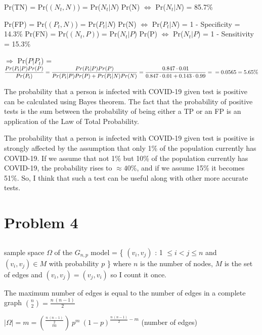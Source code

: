 \documentclass[11pt]{article}
\begin{document}
\noindent
Pr(TN) = Pr($(N_t,N)$) = Pr($N_t | N$) Pr(N) $\iff$ Pr($N_t | N$) = 85.7\% \newline

\noindent
Pr(FP) = Pr($(P_t,N)$) = Pr($P_t | N$) Pr(N) $\iff$ Pr($P_t | N$) = 1 - Specificity = 14.3\% \newline
Pr(FN) = Pr($(N_t,P)$) = Pr($N_t | P$) Pr(P) $\iff$ Pr($N_t | P$) = 1 - Sensitivity = 15.3\%

\bigskip
\noindent
$\Rightarrow$ Pr($P|P_t$) = $ \displaystyle\frac{Pr(P_t|P) Pr(P)}{Pr(P_t)} = \frac{Pr(P_t|P) Pr(P)}{Pr(P_t|P) Pr(P) + Pr(P_t|N) Pr(N)} =
\frac{0.847 \cdot 0.01}{0.847 \cdot 0.01 + 0.143 \cdot 0.99} = \\
= 0.0565 = 5.65\% $

\bigskip
The probability that a person is infected with COVID-19 given test is positive can be calculated using Bayes theorem. \newline
The fact that the probability of positive tests is the sum between the probability of being either a TP or an FP
is an application of the Law of Total Probability.

\bigskip
The probability that a person is infected with COVID-19 given test is positive is strongly affected by the assumption that only 1\% of the population
currently has COVID-19. If we assume that not 1\% but 10\% of the population currently has COVID-19, the probability rises to $\approx 40\%$,
and if we assume 15\% it becomes 51\%. \newline
So, I think that such a test can be useful along with other more accurate tests.


\newpage
\section{Problem 4}
\subsection{}
sample space $\Omega$ of the $G_{n,p}$ model = \{ $(v_i, v_j)$ : 1 $\leq i < j \leq n$ and $(v_i, v_j) \in M$ with probability $p$ \} \newline
where $n$ is the number of nodes, $M$ is the set of edges and $(v_i, v_j) = (v_j, v_i)$ so I count it once.

\bigskip
\noindent
The maximum number of edges is equal to the number of edges in a complete graph $ \displaystyle \binom{n}{2} = \frac{n \ (n-1)}{2} $

\bigskip
\noindent
$ \displaystyle |\Omega| = m = \binom{\frac{n \ (n-1)}{2}}{m} \ p^m \ (1-p)^{\frac{n \ (n-1)}{2}-m} $   \hspace{1cm} (number of edges)
\end{document}
